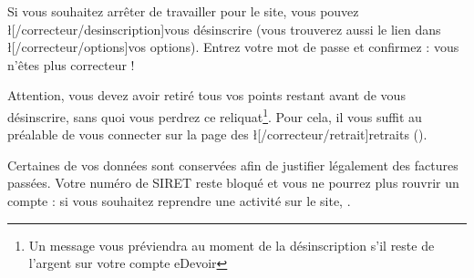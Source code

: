 ﻿Si vous souhaitez arrêter de travailler pour le site, vous pouvez \l[/correcteur/desinscription]{vous désinscrire} (vous trouverez aussi le lien dans \l[/correcteur/options]{vos options}).
Entrez votre mot de passe et confirmez : vous n'êtes plus correcteur !

Attention, vous devez avoir retiré tous vos points restant avant de vous désinscrire, sans quoi vous perdrez ce reliquat\footnote{Un message vous préviendra au moment de la désinscription s'il reste de l'argent sur votre compte eDevoir}. Pour cela, il vous suffit au préalable de vous connecter sur la page des \l[/correcteur/retrait]{retraits} ().

Certaines de vos données sont conservées afin de justifier légalement des factures passées. Votre numéro de SIRET reste bloqué et vous ne pourrez plus rouvrir un compte : si vous souhaitez reprendre une activité sur le site, .